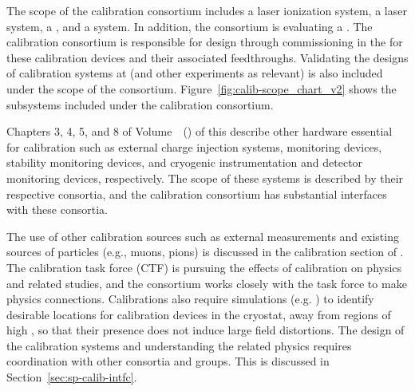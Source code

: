 


The scope of the calibration consortium includes a laser ionization system, a \phel laser system, a 
, 
and a  system. In addition, the consortium is evaluating a .
The calibration consortium is responsible for design through commissioning in the  for these calibration devices and their associated feedthroughs. Validating the designs of calibration systems at  (and other experiments as relevant) is also included under the scope of the consortium. Figure~\ref{fig:calib-scope_chart_v2} shows the subsystems included under the calibration consortium. 

Chapters 3, 4, 5, and 8 of Volume~\volnumbersp~(\voltitlesp) of this  describe other hardware essential for calibration such as  external charge injection systems,  monitoring devices,  stability monitoring devices, and cryogenic instrumentation and detector monitoring devices, respectively. The scope of these systems is described by their respective consortia, and the calibration consortium has substantial interfaces with these consortia. 

The use of other calibration sources such as external measurements and existing sources of particles (e.g., muons, pions) is discussed in the calibration section of  \physchtools. 
The calibration task force (CTF) is pursuing the effects of calibration on physics and related studies, and the consortium works closely with the task force to make physics connections. Calibrations also require simulations (e.g. \efield) to identify desirable locations for calibration devices in the cryostat, away from regions of high \efield, so that their presence does not induce large field distortions. 
The design of the calibration systems and understanding the related physics requires coordination with other consortia and groups. This is discussed in Section~\ref{sec:sp-calib-intfc}.

